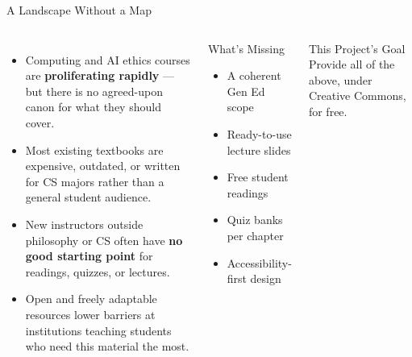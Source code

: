 \documentclass[aspectratio=169,10pt]{beamer}
\begin{document}
\begin{frame}{A Landscape Without a Map}
\begin{columns}[c]
\begin{itemize}
  \item Computing and AI ethics courses are \textbf{proliferating rapidly} --- but there is no agreed-upon canon for what they should cover.
  \item Most existing textbooks are expensive, outdated, or written for CS majors rather than a general student audience.
  \item New instructors outside philosophy or CS often have \textbf{no good starting point} for readings, quizzes, or lectures.
  \item Open and freely adaptable resources lower barriers at institutions teaching students who need this material the most.
\end{itemize}
\begin{block}{What's Missing}
\footnotesize
\begin{itemize}
  \item A coherent Gen Ed scope
  \item Ready-to-use lecture slides
  \item Free student readings
  \item Quiz banks per chapter
  \item Accessibility-first design
\end{itemize}
\end{block}
\vspace{0.25em}
\begin{exampleblock}{This Project's Goal}
\footnotesize Provide all of the above, under Creative Commons, for free.
\end{exampleblock}
\end{columns}
\end{frame}
\end{document}
